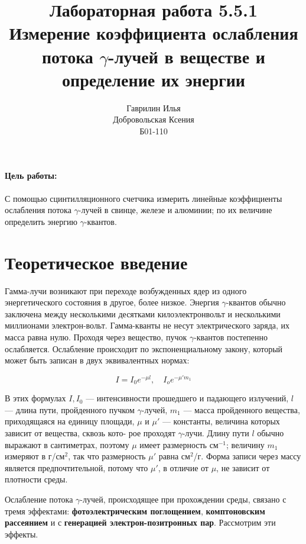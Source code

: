 \documentclass[a4paper,12pt]{article} %
\author{Гаврилин Илья\\
	Добровольская Ксения\\
	Б01-110}
\title{\textbf{Лабораторная работа 5.5.1\\ 
		Измерение коэффициента ослабления потока $\gamma$-лучей в веществе и определение их энергии}}
\newcommand{\ga}{\ensuremath{\gamma}}
\begin{document}
	\maketitle
	\paragraph*{Цель работы:} С помощью сцинтилляционного счетчика измерить линейные коэффициенты ослабления потока $ \gamma $-лучей в свинце, железе и алюминии; по их величине определить энергию $ \gamma $-квантов.
	
	\section{Теоретическое введение}
	
	Гамма-лучи возникают при переходе возбужденных ядер из одного энергетического состояния в другое, более низкое. Энергия $ \gamma $-квантов обычно заключена между несколькими десятками килоэлектронвольт и несколькими миллионами электрон-вольт. Гамма-кванты не несут электрического заряда, их масса равна нулю. Проходя через вещество, пучок $ \gamma $-квантов постепенно ослабляется. Ослабление происходит по экспоненциальному закону, который может быть записан в двух эквивалентных нормах:
	
	\begin{equation}\label{I(mu)}
		I = I_0 e^{-\mu l}, \quad I_o e^{-\mu 'm_1} 
	\end{equation}
	
	В этих формулах $ I, I_0 $ --- интенсивности прошедшего и падающего излучений, $ l $ --- длина пути, пройденного пучком \ga-лучей, $ m_1 $ ---
	масса пройденного вещества, приходящаяся на единицу площади, $ \mu $ и
	$ \mu' $ --- константы, величина которых зависит от вещества, сквозь кото-
	рое проходят \ga-лучи. Длину пути $ l $ обычно выражают в сантиметрах,
	поэтому $ \mu $ имеет размерность см$ ^{-1} $; величину $ m_1 $ измеряют в г/см$ ^2 $,
	так что размерность $ \mu' $ равна см$ ^2 $/г. Форма записи через массу является предпочтительной, потому что $ \mu' $, в отличие от $ \mu $, не зависит от плотности среды. 
	
	Ослабление потока \ga-лучей, происходящее при прохождении среды, связано с тремя эффектами: \textbf{фотоэлектрическим поглощением},
	\textbf{комптоновским рассеянием} и с \textbf{генерацией электрон-позитронных пар}. Рассмотрим эти эффекты.
	
\end{document}
